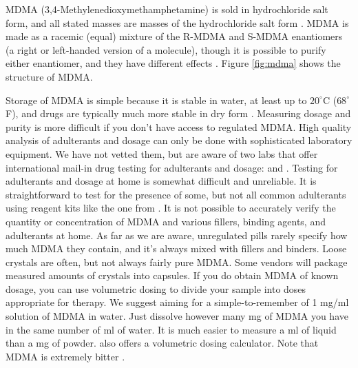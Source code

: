 \documentclass[12pt,letterpaper]{book}
\begin{document}
MDMA (3,4-Methylenedioxymethamphetamine) is sold in hydrochloride salt form, and all stated masses are masses of the hydrochloride salt form \cite{liechtiInteractions}. MDMA is made as a racemic (equal) mixture of the R-MDMA and S-MDMA enantiomers (a right or left-handed version of a molecule), though it is possible to purify either enantiomer, and they have different effects \cite{straumann2024racemic}. Figure \ref{fig:mdma} shows the structure of MDMA.

Storage of MDMA is simple because it is stable in water, at least up to $20^{\circ}$C ($68^{\circ}$F), and drugs are typically much more stable in dry form \cite{clauwaertStability}. Measuring dosage and purity is more difficult if you don't have access to regulated MDMA. High quality analysis of adulterants and dosage can only be done with sophisticated laboratory equipment. We have not vetted them, but are aware of two labs that offer international mail-in drug testing for adulterants and dosage: \textcite{kykeonTesting} and \textcite{energyTesting}. Testing for adulterants and dosage at home is somewhat difficult and unreliable. It is straightforward to test for the presence of some, but not all common adulterants using reagent kits like the one from \textcite{danceSafeTestingKit} \cite{reagentInstructions}. It is not possible to accurately verify the quantity or concentration of MDMA and various fillers, binding agents, and adulterants at home. As far as we are aware, unregulated pills rarely specify how much MDMA they contain, and it's always mixed with fillers and binders. Loose crystals are often, but not always fairly pure MDMA. Some vendors will package measured amounts of crystals into capsules. If you do obtain MDMA of known dosage, you can use volumetric dosing to divide your sample into doses appropriate for therapy. We suggest aiming for a simple-to-remember of 1 mg/ml solution of MDMA in water. Just dissolve however many mg of MDMA you have in the same number of ml of water. It is much easier to measure a ml of liquid than a mg of powder. \textcite{volumetricDilution} also offers a volumetric dosing calculator. Note that MDMA is extremely bitter \cite{milivcevic2020bitter}.
\end{document}
